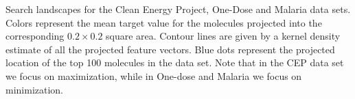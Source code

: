 Search landscapes for the Clean Energy Project, One-Dose and Malaria data sets.  
Colors represent the mean target value for the molecules projected into the corresponding $0.2 \times 0.2$ square area. Contour lines are given by a kernel density estimate of all the projected feature vectors. Blue dots represent the projected location of the top 100 molecules in the data set. Note that in the CEP data set we focus on maximization, while in One-dose and Malaria we focus on minimization.
\label{fig:info_landscapes}